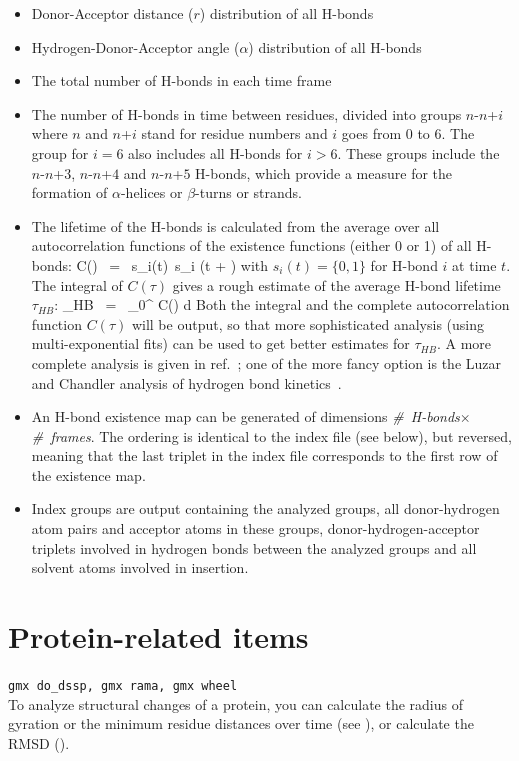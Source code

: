 \begin{itemize}
\item
Donor-Acceptor distance ($r$) distribution of all H-bonds
\item
Hydrogen-Donor-Acceptor angle ($\alpha$) distribution of all H-bonds 
\item
The total number of H-bonds in each time frame
\item
\newcommand{\nn}[1]{$n$-$n$+$#1$}
The number of H-bonds in time between residues, divided into groups
\nn{i} where $n$ and $n$+$i$ stand for residue numbers and $i$ goes
from 0 to 6. The group for $i=6$ also includes all H-bonds for
$i>6$. These groups include the \nn{3}, \nn{4} and \nn{5} H-bonds,
which provide a measure for the formation of $\alpha$-helices or
$\beta$-turns or strands.
\item
The lifetime of the H-bonds is calculated from the average over all
autocorrelation functions of the existence functions (either 0 or 1)
of all H-bonds:
\beq
C(\tau) ~=~ \langle s_i(t)~s_i (t + \tau) \rangle
\label{eqn:hbcorr}
\eeq
with $s_i(t) = \{0,1\}$ for H-bond $i$ at time $t$. The integral of
$C(\tau)$ gives a rough estimate of the average H-bond lifetime
$\tau_{HB}$:
\beq
\tau_{HB} ~=~ \int_{0}^{\infty} C(\tau) d\tau
\label{eqn:hblife}
\eeq
Both the integral and the complete autocorrelation function $C(\tau)$
will be output, so that more sophisticated analysis ({\eg}\@ using
multi-exponential fits) can be used to get better estimates for
$\tau_{HB}$. A more complete analysis is given in ref.~\cite{Spoel2006b};
one of the more fancy option is the Luzar and Chandler analysis
of hydrogen bond kinetics~\cite{Luzar96b,Luzar2000a}. 
\item
An H-bond existence map can be generated of dimensions {\em
\#~H-bonds}$\times${\em \#~frames}. The ordering is identical to the index 
file (see below), but reversed, meaning that the last triplet in the index
file corresponds to the first row of the existence map.
\item
Index groups are output containing the analyzed groups, all
donor-hydrogen atom pairs and acceptor atoms in these groups,
donor-hydrogen-acceptor triplets involved in hydrogen bonds between
the analyzed groups and all solvent atoms involved in insertion.

\end{itemize}

%

\section{Protein-related items}
{\tt gmx do_dssp, gmx rama, gmx wheel}\\
To analyze structural changes of a protein, you can calculate the radius of 
gyration or the minimum residue distances over time 
(see ), or calculate the RMSD ().

